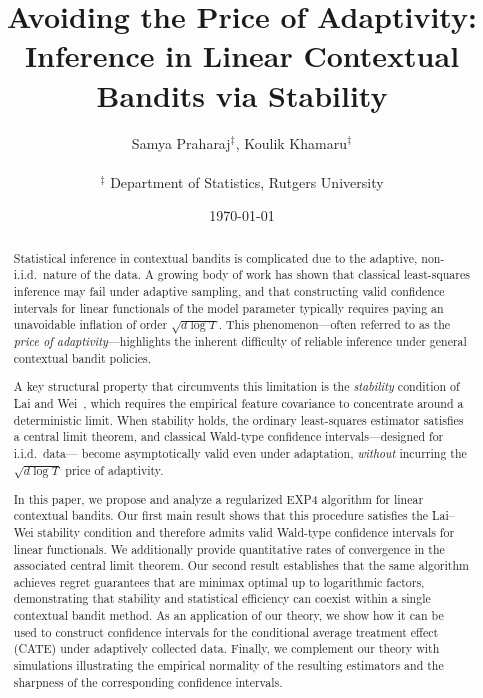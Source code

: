 \documentclass[11pt,letterpaper]{article}
\title{\LARGE \textbf{Avoiding the Price of Adaptivity: \\  Inference in Linear Contextual Bandits via Stability}}
\author{
\large 
Samya Praharaj$^{\ddagger}$, Koulik Khamaru$^{\ddagger}$\\
\normalsize   \\[0.3cm]
\normalsize $^{\ddagger}$ Department of Statistics, Rutgers University
}
\date{\today}
\theoremstyle{plain}
\theoremstyle{definition}  %
\begin{document}
\maketitle




\begin{abstract}
Statistical inference in contextual bandits is complicated due to the adaptive, non-i.i.d.\ nature of the
data. A growing body of work has shown that classical least-squares inference may fail under
adaptive sampling, and that constructing valid confidence intervals for linear functionals of the
model parameter typically requires paying an unavoidable inflation of order $\sqrt{d \log T}$.
This phenomenon---often referred to as the \emph{price of adaptivity}---highlights the inherent
difficulty of reliable inference under general contextual bandit policies.

A key structural property that circumvents this limitation is the \emph{stability} condition of
Lai and Wei~\citep{lai1982least}, which requires the empirical feature covariance to concentrate
around a deterministic limit. When stability holds, the ordinary least-squares estimator satisfies
a central limit theorem, and classical Wald-type confidence intervals---designed for i.i.d.\ data---
become asymptotically valid even under adaptation, \emph{without} incurring the $\sqrt{d \log T}$
price of adaptivity. 

In this paper, we propose and analyze a regularized EXP4 algorithm for linear contextual bandits. Our
first main result shows that this procedure satisfies the Lai--Wei stability condition and therefore
admits valid Wald-type confidence intervals for linear functionals. We
additionally provide quantitative rates of convergence in the associated central limit theorem. Our
second result establishes that the same algorithm achieves regret guarantees that are minimax
optimal up to logarithmic factors, demonstrating that stability and statistical efficiency can
coexist within a single contextual bandit method. As an application of our theory, we show how it can be used to construct confidence intervals for the conditional average treatment effect (CATE) under adaptively collected data.  Finally, we complement our theory with
simulations illustrating the empirical normality of the resulting estimators and the sharpness of the
corresponding confidence intervals.

\end{abstract}
\end{document}
